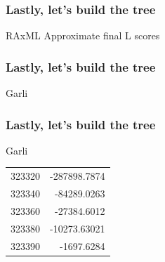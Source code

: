 \documentclass{beamer}
\begin{document}
\begin{frame}
\frametitle{Lastly, let's build the tree}
RAxML Approximate final L scores

\end{frame}

\begin{frame}
\frametitle{Lastly, let's build the tree}
Garli
\end{frame}
\begin{frame}
\frametitle{Lastly, let's build the tree}
Garli
\begin{tabular}{ l  | r }
  323320 & -287898.7874  \\
  323340 & -84289.0263 \\
  323360 & -27384.6012\\
  323380 & -10273.63021\\
  323390 & -1697.6284\\
\end{tabular}
\end{frame}
\end{document}

